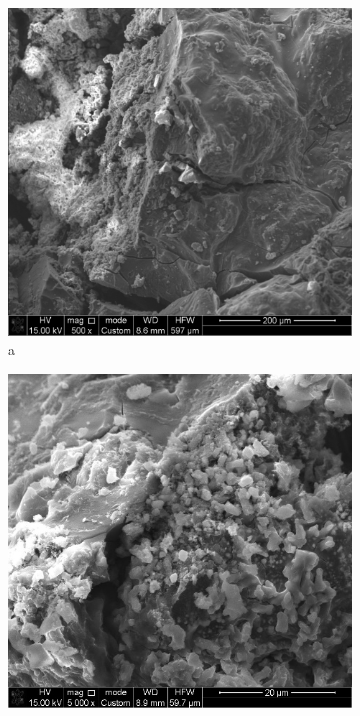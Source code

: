 \begin{figure}[H]
    \centering
    \begin{subfigure}[b]{0.32\textwidth}
        \centering
        \includegraphics[width=\textwidth,height=\textwidth]{media/chem2/image9}
        \caption*{a}
    \end{subfigure}
    \hfill
    \begin{subfigure}[b]{0.32\textwidth}
        \centering
        \includegraphics[width=\textwidth,height=\textwidth]{media/chem2/image10}

\end{subfigure}
\end{figure}
